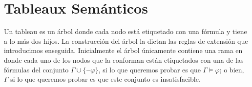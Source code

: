 \documentclass[11pt,letterpaper]{article}
\begin{document}






\section{Tableaux Semánticos}

Un tableau es un árbol donde cada nodo está etiquetado con una
fórmula y tiene a lo más dos hijos. La construcción del árbol la dictan las reglas de
extensión que introducimos enseguida. Inicialmente el árbol únicamente
contiene una rama en donde cada uno de los nodos que la conforman
están etiquetados con una de las fórmulas del conjunto $\Gamma \cup
\{\lnot \varphi \}$, si lo que queremos probar es que 
$\Gamma \models\varphi$; o bien, $\Gamma$ si lo que queremos probar es que este 
conjunto es insatisfacible.  
\end{document}
